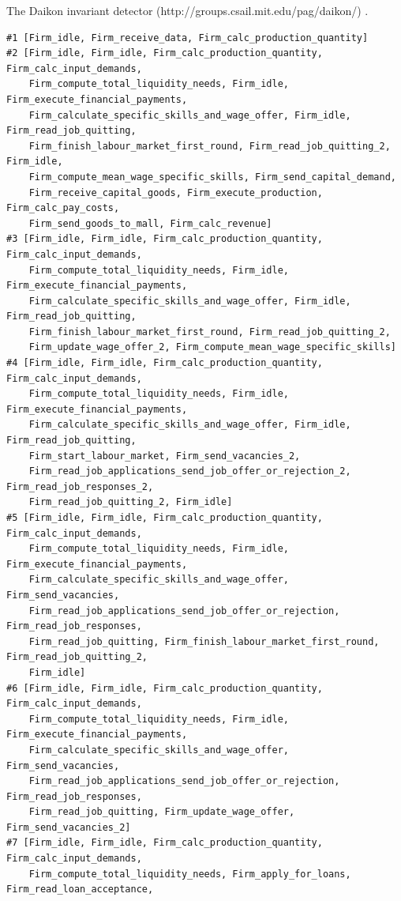 The Daikon invariant detector (http://groups.csail.mit.edu/pag/daikon/)
\cite{DAIKON:2007}.

{\tiny
\begin{verbatim}
#1 [Firm_idle, Firm_receive_data, Firm_calc_production_quantity]
#2 [Firm_idle, Firm_idle, Firm_calc_production_quantity, Firm_calc_input_demands, 
    Firm_compute_total_liquidity_needs, Firm_idle, Firm_execute_financial_payments, 
    Firm_calculate_specific_skills_and_wage_offer, Firm_idle, Firm_read_job_quitting,
    Firm_finish_labour_market_first_round, Firm_read_job_quitting_2, Firm_idle,
    Firm_compute_mean_wage_specific_skills, Firm_send_capital_demand,
    Firm_receive_capital_goods, Firm_execute_production, Firm_calc_pay_costs,
    Firm_send_goods_to_mall, Firm_calc_revenue]
#3 [Firm_idle, Firm_idle, Firm_calc_production_quantity, Firm_calc_input_demands,
    Firm_compute_total_liquidity_needs, Firm_idle, Firm_execute_financial_payments,
    Firm_calculate_specific_skills_and_wage_offer, Firm_idle, Firm_read_job_quitting,
    Firm_finish_labour_market_first_round, Firm_read_job_quitting_2,
    Firm_update_wage_offer_2, Firm_compute_mean_wage_specific_skills]
#4 [Firm_idle, Firm_idle, Firm_calc_production_quantity, Firm_calc_input_demands,
    Firm_compute_total_liquidity_needs, Firm_idle, Firm_execute_financial_payments,
    Firm_calculate_specific_skills_and_wage_offer, Firm_idle, Firm_read_job_quitting,
    Firm_start_labour_market, Firm_send_vacancies_2,
    Firm_read_job_applications_send_job_offer_or_rejection_2, Firm_read_job_responses_2,
    Firm_read_job_quitting_2, Firm_idle]
#5 [Firm_idle, Firm_idle, Firm_calc_production_quantity, Firm_calc_input_demands,
    Firm_compute_total_liquidity_needs, Firm_idle, Firm_execute_financial_payments,
    Firm_calculate_specific_skills_and_wage_offer, Firm_send_vacancies,
    Firm_read_job_applications_send_job_offer_or_rejection, Firm_read_job_responses,
    Firm_read_job_quitting, Firm_finish_labour_market_first_round, Firm_read_job_quitting_2,
    Firm_idle]
#6 [Firm_idle, Firm_idle, Firm_calc_production_quantity, Firm_calc_input_demands,
    Firm_compute_total_liquidity_needs, Firm_idle, Firm_execute_financial_payments,
    Firm_calculate_specific_skills_and_wage_offer, Firm_send_vacancies,
    Firm_read_job_applications_send_job_offer_or_rejection, Firm_read_job_responses,
    Firm_read_job_quitting, Firm_update_wage_offer, Firm_send_vacancies_2]
#7 [Firm_idle, Firm_idle, Firm_calc_production_quantity, Firm_calc_input_demands,
    Firm_compute_total_liquidity_needs, Firm_apply_for_loans, Firm_read_loan_acceptance,

\end{verbatim}}
